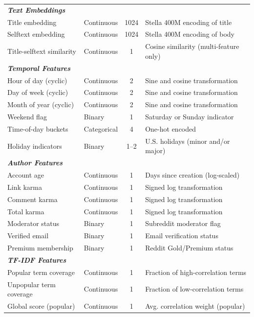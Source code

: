 \begin{longtable}[c]{llcp{6cm}}
\multicolumn{4}{l}{\textit{\textbf{Text Embeddings}}} \\
\quad Title embedding & Continuous & 1024 & Stella 400M encoding of title \\
\quad Selftext embedding & Continuous & 1024 & Stella 400M encoding of body \\
\quad Title-selftext similarity & Continuous & 1 & Cosine similarity (multi-feature only) \\
\midrule
\multicolumn{4}{l}{\textit{\textbf{Temporal Features}}} \\
\quad Hour of day (cyclic) & Continuous & 2 & Sine and cosine transformation \\
\quad Day of week (cyclic) & Continuous & 2 & Sine and cosine transformation \\
\quad Month of year (cyclic) & Continuous & 2 & Sine and cosine transformation \\
\quad Weekend flag & Binary & 1 & Saturday or Sunday indicator \\
\quad Time-of-day buckets & Categorical & 4 & One-hot encoded \\
\quad Holiday indicators & Binary & 1--2 & U.S. holidays (minor and/or major) \\
\midrule
\multicolumn{4}{l}{\textit{\textbf{Author Features}}} \\
\quad Account age & Continuous & 1 & Days since creation (log-scaled) \\
\quad Link karma & Continuous & 1 & Signed log transformation \\
\quad Comment karma & Continuous & 1 & Signed log transformation \\
\quad Total karma & Continuous & 1 & Signed log transformation \\
\quad Moderator status & Binary & 1 & Subreddit moderator flag \\
\quad Verified email & Binary & 1 & Email verification status \\
\quad Premium membership & Binary & 1 & Reddit Gold/Premium status \\
\midrule
\multicolumn{4}{l}{\textit{\textbf{TF-IDF Features}}} \\
\quad Popular term coverage & Continuous & 1 & Fraction of high-correlation terms \\
\quad Unpopular term coverage & Continuous & 1 & Fraction of low-correlation terms \\
\quad Global score (popular) & Continuous & 1 & Avg. correlation weight (popular) \\

\end{longtable}
